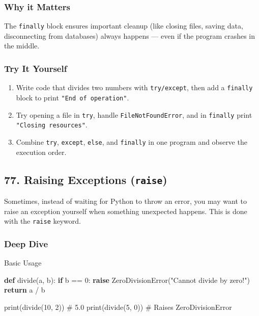 \documentclass[
  letterpaper,
  DIV=11,
  numbers=noendperiod]{scrreprt}
\newenvironment{Shaded}{\begin{snugshade}}{\end{snugshade}}
\newcommand{\BuiltInTok}[1]{\textcolor[rgb]{0.00,0.23,0.31}{#1}}
\newcommand{\CommentTok}[1]{\textcolor[rgb]{0.37,0.37,0.37}{#1}}
\newcommand{\ControlFlowTok}[1]{\textcolor[rgb]{0.00,0.23,0.31}{\textbf{#1}}}
\newcommand{\DecValTok}[1]{\textcolor[rgb]{0.68,0.00,0.00}{#1}}
\newcommand{\KeywordTok}[1]{\textcolor[rgb]{0.00,0.23,0.31}{\textbf{#1}}}
\newcommand{\NormalTok}[1]{\textcolor[rgb]{0.00,0.23,0.31}{#1}}
\newcommand{\OperatorTok}[1]{\textcolor[rgb]{0.37,0.37,0.37}{#1}}
\newcommand{\PreprocessorTok}[1]{\textcolor[rgb]{0.68,0.00,0.00}{#1}}
\newcommand{\StringTok}[1]{\textcolor[rgb]{0.13,0.47,0.30}{#1}}
\providecommand{\tightlist}{%
  \setlength{\itemsep}{0pt}\setlength{\parskip}{0pt}}
\begin{document}
\subsubsection{Why it Matters}\label{why-it-matters-75}

The \texttt{finally} block ensures important cleanup (like closing
files, saving data, disconnecting from databases) always happens ---
even if the program crashes in the middle.

\subsubsection{Try It Yourself}\label{try-it-yourself-75}

\begin{enumerate}
\def\labelenumi{\arabic{enumi}.}
\tightlist
\item
  Write code that divides two numbers with \texttt{try/except}, then add
  a \texttt{finally} block to print \texttt{"End\ of\ operation"}.
\item
  Try opening a file in \texttt{try}, handle \texttt{FileNotFoundError},
  and in \texttt{finally} print \texttt{"Closing\ resources"}.
\item
  Combine \texttt{try}, \texttt{except}, \texttt{else}, and
  \texttt{finally} in one program and observe the execution order.
\end{enumerate}

\subsection{\texorpdfstring{77. Raising Exceptions
(\texttt{raise})}{77. Raising Exceptions (raise)}}\label{raising-exceptions-raise}

Sometimes, instead of waiting for Python to throw an error, you may want
to raise an exception yourself when something unexpected happens. This
is done with the \texttt{raise} keyword.

\subsubsection{Deep Dive}\label{deep-dive-76}

Basic Usage

\begin{Shaded}
\begin{Highlighting}[]
\KeywordTok{def}\NormalTok{ divide(a, b):}
    \ControlFlowTok{if}\NormalTok{ b }\OperatorTok{==} \DecValTok{0}\NormalTok{:}
        \ControlFlowTok{raise} \PreprocessorTok{ZeroDivisionError}\NormalTok{(}\StringTok{"Cannot divide by zero!"}\NormalTok{)}
    \ControlFlowTok{return}\NormalTok{ a }\OperatorTok{/}\NormalTok{ b}

\BuiltInTok{print}\NormalTok{(divide(}\DecValTok{10}\NormalTok{, }\DecValTok{2}\NormalTok{))   }\CommentTok{\# 5.0}
\BuiltInTok{print}\NormalTok{(divide(}\DecValTok{5}\NormalTok{, }\DecValTok{0}\NormalTok{))    }\CommentTok{\# Raises ZeroDivisionError}
\end{Highlighting}
\end{Shaded}
\end{document}
